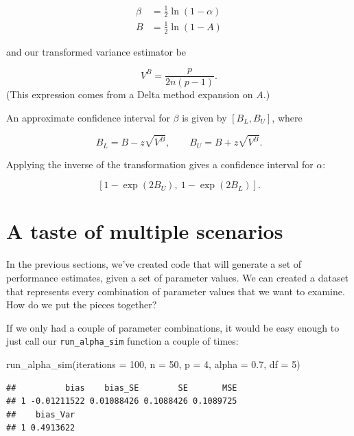 \documentclass[
]{book}
\newenvironment{Shaded}{\begin{snugshade}}{\end{snugshade}}
\newcommand{\AttributeTok}[1]{\textcolor[rgb]{0.77,0.63,0.00}{#1}}
\newcommand{\DecValTok}[1]{\textcolor[rgb]{0.00,0.00,0.81}{#1}}
\newcommand{\FloatTok}[1]{\textcolor[rgb]{0.00,0.00,0.81}{#1}}
\newcommand{\FunctionTok}[1]{\textcolor[rgb]{0.00,0.00,0.00}{#1}}
\newcommand{\NormalTok}[1]{#1}
\begin{document}
\[
\begin{aligned}
\beta &= \frac{1}{2} \ln\left(1 - \alpha\right) \\
B &= \frac{1}{2} \ln\left(1 - A\right)
\end{aligned}
\]

and our transformed variance estimator be

\[
V^B = \frac{p}{2 n (p - 1)}.
\]
(This expression comes from a Delta method expansion on \(A\).)

An approximate confidence interval for \(\beta\) is given by \([B_L, B_U]\), where

\[
B_L = B - z \sqrt{V^B}, \qquad B_U = B + z \sqrt{V^B}.
\]

Applying the inverse of the transformation gives a confidence interval for \(\alpha\):

\[
\left[1 - \exp(2B_U), \ 1 - \exp(2 B_L)\right].
\]

\hypertarget{a-taste-of-multiple-scenarios}{%
\section{A taste of multiple scenarios}\label{a-taste-of-multiple-scenarios}}

In the previous sections, we've created code that will generate a set of performance estimates, given a set of parameter values. We can created a dataset that represents every combination of parameter values that we want to examine. How do we put the pieces together?

If we only had a couple of parameter combinations, it would be easy enough to just call our \texttt{run\_alpha\_sim} function a couple of times:

\begin{Shaded}
\begin{Highlighting}[]
\FunctionTok{run\_alpha\_sim}\NormalTok{(}\AttributeTok{iterations =} \DecValTok{100}\NormalTok{, }\AttributeTok{n =} \DecValTok{50}\NormalTok{, }\AttributeTok{p =} \DecValTok{4}\NormalTok{, }\AttributeTok{alpha =} \FloatTok{0.7}\NormalTok{, }\AttributeTok{df =} \DecValTok{5}\NormalTok{)}
\end{Highlighting}
\end{Shaded}

\begin{verbatim}
##          bias    bias_SE        SE       MSE
## 1 -0.01211522 0.01088426 0.1088426 0.1089725
##    bias_Var
## 1 0.4913622
\end{verbatim}
\end{document}

